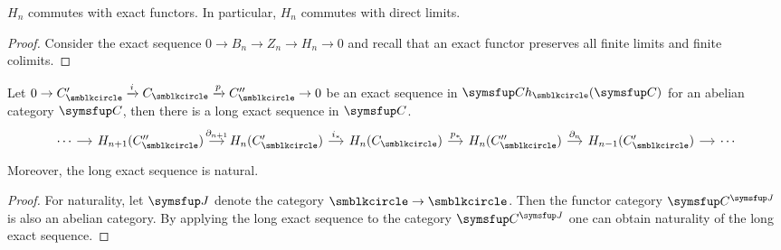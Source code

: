 \begin{proposition}
  $H_n$ commutes with exact functors. In particular, $H_n$ commutes with direct limits.
\end{proposition}

\begin{proof}
  Consider the exact sequence $0\to B_n\to Z_n\to H_n\to 0$ and recall that an exact functor preserves all finite limits and finite colimits.
\end{proof}

\begin{lemma}
  Let $0\to C_\CCCIR'\xrightarrow{i} C_\CCCIR \xrightarrow{p} C_\CCCIR''\to 0$ be an exact sequence in $\CH(\CAT{C})$ for an abelian category $\CAT{C}$, then there is a long exact sequence in $\CAT{C}$.
  \begin{equation*}
    \begin{tikzcd}[sep=small]
      \dotsb & H_{n+1}(C_\CCCIR'') & H_n(C_\CCCIR') & H_n(C_\CCCIR) & H_n(C_\CCCIR'') & H_{n-1}(C_\CCCIR') & \dotsb
      \arrow[from=1-1,]{1-2}[]{}
      \arrow[from=1-2,]{1-3}[]{\partial_{n+1}}
      \arrow[from=1-3,]{1-4}[]{i_*}
      \arrow[from=1-4,]{1-5}[]{p_*}
      \arrow[from=1-5,]{1-6}[]{\partial_n}
      \arrow[from=1-6,]{1-7}[]{}
    \end{tikzcd}
  \end{equation*}
  Moreover, the long exact sequence is natural.
\end{lemma}

\begin{proof}
  For naturality, let $\CAT{J}$ denote the category $\BCIR\to\BCIR$. Then the functor category $\CAT{C}^{\CAT{J}}$ is also an abelian category. By applying the long exact sequence to the category $\CAT{C}^{\CAT{J}}$ one can obtain naturality of the long exact sequence.
\end{proof}

